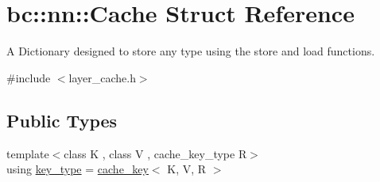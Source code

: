 \hypertarget{structbc_1_1nn_1_1Cache}{}\section{bc\+:\+:nn\+:\+:Cache Struct Reference}
\label{structbc_1_1nn_1_1Cache}


A Dictionary designed to store any type using the \textquotesingle{}store\textquotesingle{} and \textquotesingle{}load\textquotesingle{} functions.  




{\ttfamily \#include $<$layer\+\_\+cache.\+h$>$}

\subsection*{Public Types}
\begin{DoxyCompactItemize}
\item 
{\footnotesize template$<$class K , class V , cache\+\_\+key\+\_\+type R$>$ }\\using \hyperlink{structbc_1_1nn_1_1Cache_aedd77c5710dcb5f9edd8ecb3c3041048}{key\+\_\+type} = \hyperlink{structbc_1_1nn_1_1cache__key}{cache\+\_\+key}$<$ K, V, R $>$
\end{DoxyCompactItemize}
